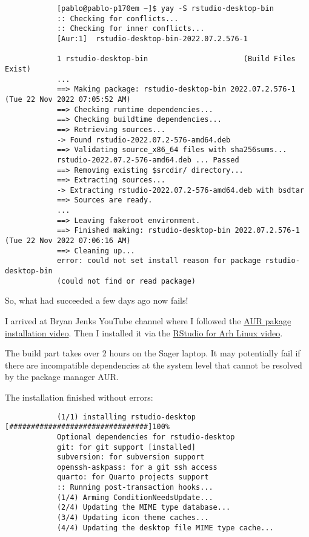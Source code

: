 \documentclass[]{scrartcl}
\begin{document}
	\begin{small}
		\begin{verbatim}
			[pablo@pablo-p170em ~]$ yay -S rstudio-desktop-bin
			:: Checking for conflicts...
			:: Checking for inner conflicts...
			[Aur:1]  rstudio-desktop-bin-2022.07.2.576-1
			
			1 rstudio-desktop-bin                      (Build Files Exist)
			...
			==> Making package: rstudio-desktop-bin 2022.07.2.576-1 (Tue 22 Nov 2022 07:05:52 AM)
			==> Checking runtime dependencies...
			==> Checking buildtime dependencies...
			==> Retrieving sources...
			-> Found rstudio-2022.07.2-576-amd64.deb
			==> Validating source_x86_64 files with sha256sums...
			rstudio-2022.07.2-576-amd64.deb ... Passed
			==> Removing existing $srcdir/ directory...
			==> Extracting sources...
			-> Extracting rstudio-2022.07.2-576-amd64.deb with bsdtar
			==> Sources are ready.
			...
			==> Leaving fakeroot environment.
			==> Finished making: rstudio-desktop-bin 2022.07.2.576-1 (Tue 22 Nov 2022 07:06:16 AM)
			==> Cleaning up...
			error: could not set install reason for package rstudio-desktop-bin 
			(could not find or read package)
		\end{verbatim}
	\end{small}
	
	So, what had succeeded a few days ago now fails!
	
	I arrived at Bryan Jenks YouTube channel where I followed the \href{https://www.youtube.com/watch?v=FhvEJxrzABI}{AUR pakage installation
	video}. Then I installed it via the \href{https://www.youtube.com/watch?v=XAId0j7RR0c}{RStudio for Arh Linux video}.
	
	The build part takes over 2 hours on the Sager laptop. It may potentially fail if there are incompatible dependencies at the 
	system level that cannot be resolved by the package manager AUR.
	
	The installation finished without errors:
	
	\begin{small}
		\begin{verbatim}
			(1/1) installing rstudio-desktop             [################################]100%
			Optional dependencies for rstudio-desktop
			git: for git support [installed]
			subversion: for subversion support
			openssh-askpass: for a git ssh access
			quarto: for Quarto projects support
			:: Running post-transaction hooks...
			(1/4) Arming ConditionNeedsUpdate...
			(2/4) Updating the MIME type database...
			(3/4) Updating icon theme caches...
			(4/4) Updating the desktop file MIME type cache...
		\end{verbatim}
	\end{small}
	
\end{document}
